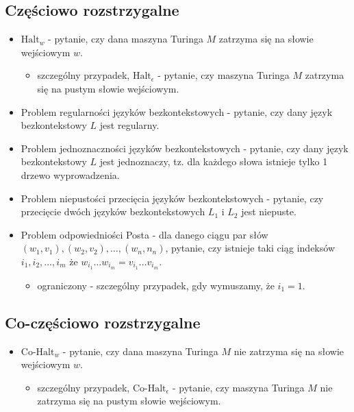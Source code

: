 \documentclass{article}
\theoremstyle{definition}
\theoremstyle{remark}
\begin{document}
\subsection{Częściowo rozstrzygalne}
\begin{itemize}
    \item $\text{Halt}_w$ - pytanie, czy dana maszyna Turinga $M$ zatrzyma się na słowie wejściowym $w$. 
    \begin{itemize}
    \item szczególny przypadek, $\text{Halt}_{\epsilon}$ - pytanie, czy maszyna Turinga $M$ zatrzyma się na pustym słowie wejściowym.
    \end{itemize}
    \item Problem regularności języków bezkontekstowych - pytanie, czy dany język bezkontekstowy $L$ jest regularny.
    \item Problem jednoznaczności języków bezkontekstowych - pytanie, czy dany język bezkontekstowy $L$ jest jednoznaczy, tz. dla każdego słowa istnieje tylko 1 drzewo wyprowadzenia.
    \item Problem niepustości przecięcia języków bezkontekstowych - pytanie, czy przecięcie dwóch języków bezkontekstowych $L_1$ i $L_2$ jest niepuste.
    \item Problem odpowiedniości Posta - dla danego ciągu par słów $(w_1, v_1), (w_2, v_2), \ldots, (w_n, n_n)$, pytanie, czy istnieje taki ciąg indeksów $i_1, i_2, \ldots, i_m$ że $ w_{i_1} \ldots w_{i_m} = v_{i_1} \ldots v_{i_m}$.
    \begin{itemize}
        \item ograniczony - szczególny przypadek, gdy wymuszamy, że $i_1=1$.
    \end{itemize}    
\end{itemize}

\subsection{Co-częściowo rozstrzygalne}
\begin{itemize}
    \item $\text{Co-Halt}_w$ - pytanie, czy dana maszyna Turinga $M$ nie zatrzyma się na słowie wejściowym $w$.
    \begin{itemize}
        \item szczególny przypadek, $\text{Co-Halt}_{\epsilon}$ - pytanie, czy maszyna Turinga $M$ nie zatrzyma się na pustym słowie wejściowym.
    \end{itemize}
\end{itemize}
\end{document}
